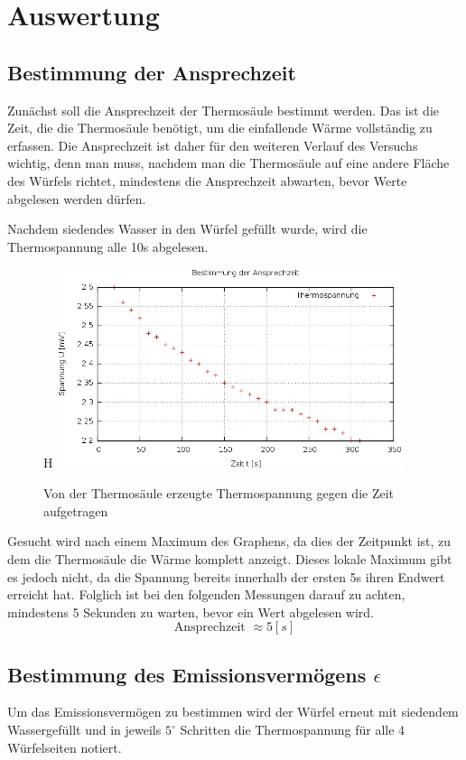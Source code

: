 \section{Auswertung}
\subsection{Bestimmung der Ansprechzeit}
Zunächst soll die Ansprechzeit der Thermosäule bestimmt werden. Das ist die Zeit, die die Thermosäule benötigt, um die einfallende Wärme vollständig zu erfassen. Die Ansprechzeit ist daher für den weiteren Verlauf des Versuchs wichtig, denn man muss, nachdem man die Thermosäule auf eine andere Fläche des Würfels richtet, mindestens die Ansprechzeit abwarten, bevor Werte abgelesen werden dürfen.

Nachdem siedendes Wasser in den Würfel gefüllt wurde, wird die Thermospannung alle 10s abgelesen.
\begin{figure}{H}
\includegraphics[width=0.9\textwidth]{pics/ansprechz.jpg}
\caption{Von der Thermosäule erzeugte Thermospannung gegen die Zeit aufgetragen}
\end{figure}

Gesucht wird nach einem Maximum des Graphens, da dies der Zeitpunkt ist, zu dem die Thermosäule die Wärme komplett anzeigt. Dieses lokale Maximum gibt es jedoch nicht, da die Spannung bereits innerhalb der ersten 5s ihren Endwert erreicht hat. Folglich ist bei den folgenden Messungen darauf zu achten, mindestens 5 Sekunden zu warten, bevor ein Wert abgelesen wird.
\begin{equation}
\text{Ansprechzeit }\approx 5[s]
\end{equation}

\subsection{Bestimmung des Emissionsvermögens $\epsilon$}
Um das Emissionsvermögen zu bestimmen wird der Würfel erneut mit siedendem Wassergefüllt und in jeweils $5^\circ$ Schritten die Thermospannung für alle 4 Würfelseiten notiert.

